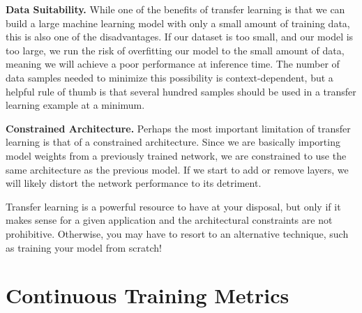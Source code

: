 {{{{    \textbf{Data Suitability.} While one of the benefits of transfer learning is that we can build a large machine learning model with only a small amount of training data, this is also one of the disadvantages. If our dataset is too small, and our model is too large, we run the risk of overfitting our model to the small amount of data, meaning we will achieve a poor performance at inference time. The number of data samples needed to minimize this possibility is context-dependent, but a helpful rule of thumb is that several hundred samples should be used in a transfer learning example at a minimum.
    
    \textbf{Constrained Architecture.} Perhaps the most important limitation of transfer learning is that of a constrained architecture. Since we are basically importing model weights from a previously trained network, we are constrained to use the same architecture as the previous model. If we start to add or remove layers, we will likely distort the network performance to its detriment.
    
    Transfer learning is a powerful resource to have at your disposal, but only if it makes sense for a given application and the architectural constraints are not prohibitive. Otherwise, you may have to resort to an alternative technique, such as training your model from scratch!

 
 \section{Continuous Training Metrics}
 
}}}}
